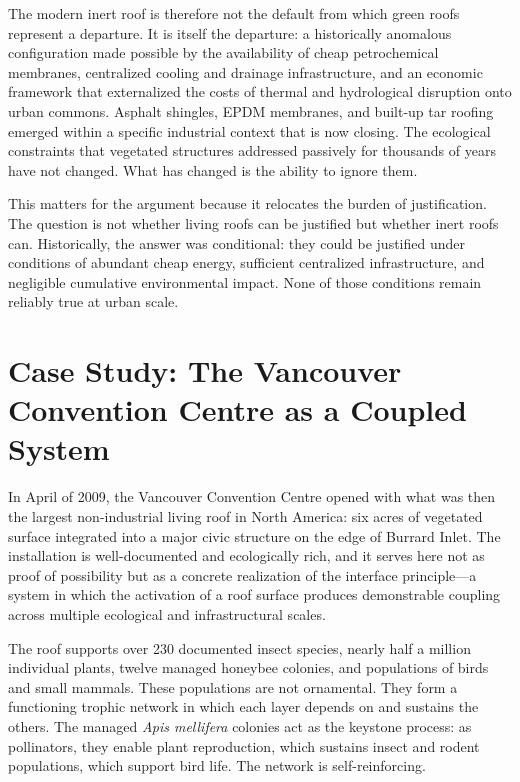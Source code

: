 \documentclass[12pt, a4paper]{article}
\theoremstyle{plain}
\theoremstyle{remark}
\begin{document}
The modern inert roof is therefore not the default from which green roofs represent a departure. It is itself the departure: a historically anomalous configuration made possible by the availability of cheap petrochemical membranes, centralized cooling and drainage infrastructure, and an economic framework that externalized the costs of thermal and hydrological disruption onto urban commons. Asphalt shingles, EPDM membranes, and built-up tar roofing emerged within a specific industrial context that is now closing. The ecological constraints that vegetated structures addressed passively for thousands of years have not changed. What has changed is the ability to ignore them.

This matters for the argument because it relocates the burden of justification. The question is not whether living roofs can be justified but whether inert roofs can. Historically, the answer was conditional: they could be justified under conditions of abundant cheap energy, sufficient centralized infrastructure, and negligible cumulative environmental impact. None of those conditions remain reliably true at urban scale.

\section{Case Study: The Vancouver Convention Centre as a Coupled System}

In April of 2009, the Vancouver Convention Centre opened with what was then the largest non-industrial living roof in North America: six acres of vegetated surface integrated into a major civic structure on the edge of Burrard Inlet. The installation is well-documented and ecologically rich, and it serves here not as proof of possibility but as a concrete realization of the interface principle---a system in which the activation of a roof surface produces demonstrable coupling across multiple ecological and infrastructural scales.

The roof supports over 230 documented insect species, nearly half a million individual plants, twelve managed honeybee colonies, and populations of birds and small mammals. These populations are not ornamental. They form a functioning trophic network in which each layer depends on and sustains the others. The managed \textit{Apis mellifera} colonies act as the keystone process: as pollinators, they enable plant reproduction, which sustains insect and rodent populations, which support bird life. The network is self-reinforcing.
\end{document}
